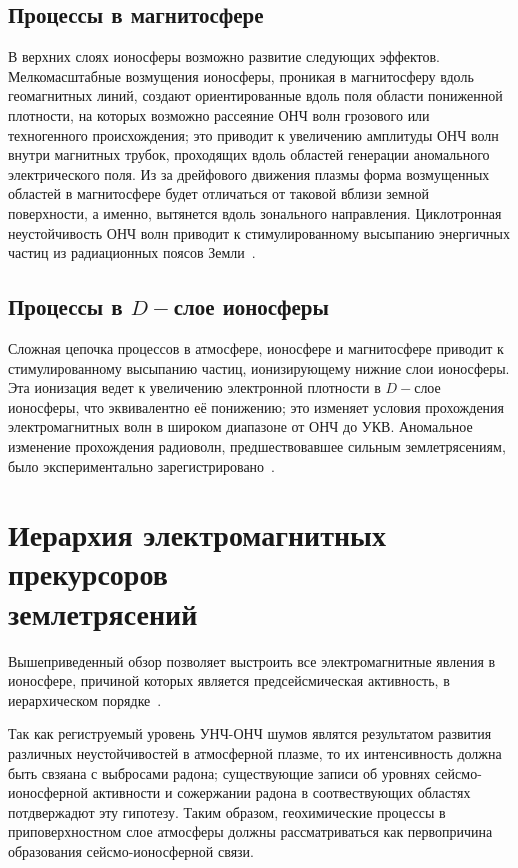 \documentclass[12pt, oneside, a4paper]{article}
\begin{document}
\subsection{Процессы в магнитосфере}
В верхних слоях ионосферы возможно развитие следующих эффектов. Мелкомасштабные возмущения ионосферы, проникая в магнитосферу вдоль геомагнитных линий, создают ориентированные вдоль поля области пониженной плотности, на которых возможно рассеяние ОНЧ волн грозового или техногенного происхождения; это приводит к увеличению амплитуды ОНЧ волн внутри магнитных трубок, проходящих вдоль областей генерации аномального электрического поля. Из за дрейфового движения плазмы форма возмущенных областей в магнитосфере будет отличаться от таковой вблизи земной поверхности, а именно, вытянется вдоль зонального направления. Циклотронная неустойчивость ОНЧ волн приводит к стимулированному высыпанию  энергичных частиц из радиационных поясов Земли~\cite{Pulinets_Hegai:2002a}.
\subsection{Процессы в $D-$слое ионосферы}
Сложная цепочка процессов в атмосфере, ионосфере и магнитосфере приводит к стимулированному высыпанию частиц, ионизирующему нижние слои ионосферы. Эта ионизация ведет к увеличению электронной плотности в $D-$слое ионосферы, что эквивалентно её понижению; это изменяет условия прохождения электромагнитных волн в широком диапазоне от ОНЧ до УКВ. Аномальное изменение прохождения радиоволн, предшествовавшее сильным землетрясениям, было экспериментально зарегистрировано~\cite{Gufeld:1992}.  
\section{Иерархия электромагнитных прекурсоров\\землетрясений}
Вышеприведенный  обзор позволяет выстроить все электромагнитные явления в ионосфере, причиной которых является предсейсмическая активность, в иерархическом порядке~\cite{Krider_Roble:1986_2002}. 

Так как региструемый уровень УНЧ-ОНЧ шумов являтся результатом развития различных неустойчивостей в атмосферной плазме, то их интенсивность должна быть свзяана с выбросами радона; существующие записи об уровнях сейсмо-ионосферной активности и сожержании радона в соотвествующих областях потдвержадют эту гипотезу. Таким образом, геохимические процессы в приповерхностном слое атмосферы должны рассматриваться как первопричина образования сейсмо-ионосферной связи. 
\end{document}
